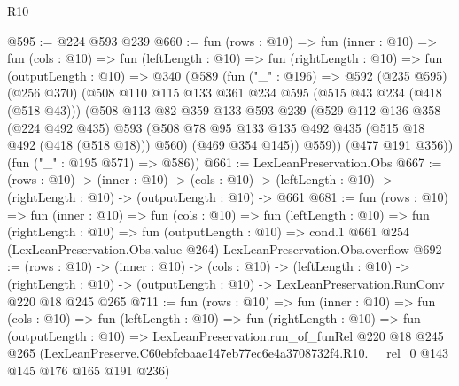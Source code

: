 \begin{lexlean}{R10}
\begin{coremodule}
@595 := @224 @593 @239
@660 := fun (rows : @10) =>
  fun (inner : @10) =>
  fun (cols : @10) =>
  fun (leftLength : @10) =>
  fun (rightLength : @10) =>
  fun (outputLength : @10) =>
  @340
    (@589
      (fun ("_" : @196) =>
      @592
        (@235 @595)
        (@256 @370)
        (@508
          @110
          @115
          @133
          @361
          @234
          @595
          (@515 @43 @234 (@418 (@518 @43)))
          (@508
            @113
            @82
            @359
            @133
            @593
            @239
            (@529
              @112
              @136
              @358
              (@224 @492 @435)
              @593
              (@508 @78 @95 @133 @135 @492 @435 (@515 @18 @492 (@418 (@518 @18))) @560)
              (@469 @354 @145))
            @559))
        (@477 @191 @356))
      (fun ("_" : @195 @571) => @586))
@661 := LexLeanPreservation.Obs
@667 := (rows : @10) ->
  (inner : @10) ->
  (cols : @10) -> (leftLength : @10) -> (rightLength : @10) -> (outputLength : @10) -> @661
@681 := fun (rows : @10) =>
  fun (inner : @10) =>
  fun (cols : @10) =>
  fun (leftLength : @10) =>
  fun (rightLength : @10) =>
  fun (outputLength : @10) =>
  cond.{1} @661 @254 (LexLeanPreservation.Obs.value @264) LexLeanPreservation.Obs.overflow
@692 := (rows : @10) ->
  (inner : @10) ->
  (cols : @10) ->
  (leftLength : @10) ->
  (rightLength : @10) -> (outputLength : @10) -> LexLeanPreservation.RunConv @220 @18 @245 @265
@711 := fun (rows : @10) =>
  fun (inner : @10) =>
  fun (cols : @10) =>
  fun (leftLength : @10) =>
  fun (rightLength : @10) =>
  fun (outputLength : @10) =>
  LexLeanPreservation.run_of_funRel
    @220
    @18
    @245
    @265
    (LexLeanPreserve.C60ebfcbaae147eb77ec6e4a3708732f4.R10.__rel_0 @143 @145 @176 @165 @191 @236)
\end{coremodule}
\end{lexlean}
